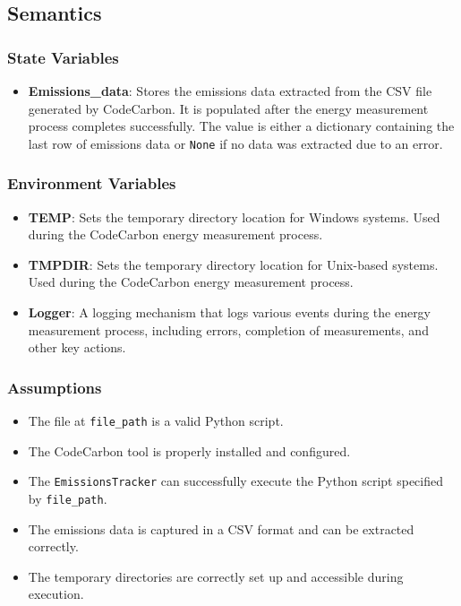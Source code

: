 \documentclass[12pt, titlepage]{article}
\begin{document}
\subsection{Semantics}

\subsubsection{State Variables}

\begin{itemize}
    \item \textbf{Emissions\_data}: Stores the emissions data extracted from the CSV file generated by CodeCarbon. It is populated after the energy measurement process completes successfully. The value is either a dictionary containing the last row of emissions data or \texttt{None} if no data was extracted due to an error.

\end{itemize}

\subsubsection{Environment Variables}

\begin{itemize}
  \item \textbf{TEMP}: Sets the temporary directory location for Windows systems. Used during the CodeCarbon energy measurement process.
  \item \textbf{TMPDIR}: Sets the temporary directory location for Unix-based systems. Used during the CodeCarbon energy measurement process.
  \item \textbf{Logger}: A logging mechanism that logs various events during the energy measurement process, including errors, completion of measurements, and other key actions.
\end{itemize}

\subsubsection{Assumptions}

\begin{itemize}
  \item The file at \texttt{file\_path} is a valid Python script.
  \item The CodeCarbon tool is properly installed and configured.
  \item The \texttt{EmissionsTracker} can successfully execute the Python script specified by \texttt{file\_path}.
  \item The emissions data is captured in a CSV format and can be extracted correctly.
  \item The temporary directories are correctly set up and accessible during execution.
\end{itemize}
\end{document}
